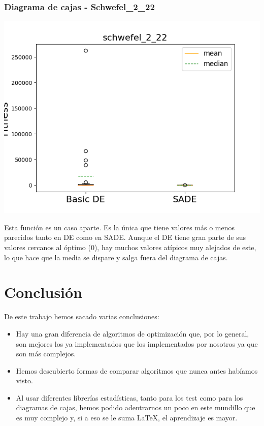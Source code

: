 \documentclass[11pt, a4paper, titlepage]{article}
\begin{document}
\subsubsection{Diagrama de cajas - Schwefel\_2\_22}
\begin{center}
\includegraphics[scale=0.85]{schwefel_2_22}
\end{center}
Esta función es un caso aparte. Es la única que tiene valores más o menos parecidos tanto en DE como en SADE. Aunque el DE tiene gran parte de sus valores cercanos al óptimo (0), hay muchos valores atípicos muy alejados de este, lo que hace que la media se dispare y salga fuera del diagrama de cajas.

\clearpage

\section{Conclusión}
De este trabajo hemos sacado varias conclusiones:
\begin{itemize}
\item Hay una gran diferencia de algoritmos de optimización que, por lo general, son mejores los ya implementados que los implementados por nosotros ya que son más complejos.
\item Hemos descubierto formas de comparar algoritmos que nunca antes habíamos visto.
\item Al usar diferentes librerías estadísticas, tanto para los test como para los diagramas de cajas, hemos podido adentrarnos un poco en este mundillo que es muy complejo y, si a eso se le suma \LaTeX, el aprendizaje es mayor.
\end{itemize}
\end{document}
